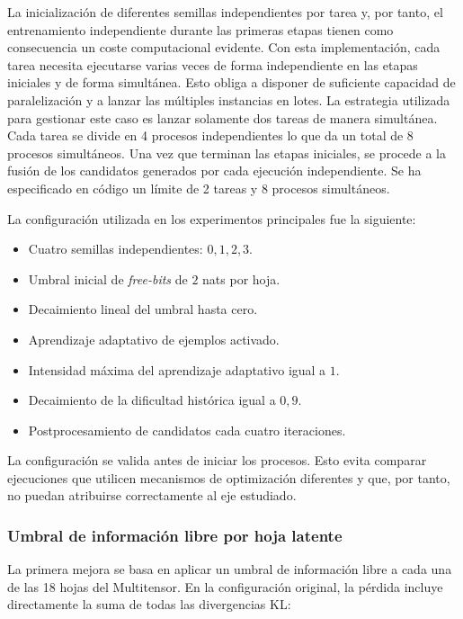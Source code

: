 \documentclass[11pt,a4paper,spanish]{book}
\numberwithin{equation}{chapter}
\numberwithin{figure}{chapter}
\begin{document}
La inicialización de diferentes semillas independientes por tarea y, por tanto, el entrenamiento independiente durante las primeras etapas tienen como
consecuencia un coste computacional evidente. Con esta implementación, cada tarea necesita ejecutarse varias veces de forma independiente
en las etapas iniciales y de forma simultánea. Esto obliga a disponer de suficiente capacidad de paralelización y a lanzar las múltiples instancias
en lotes. La estrategia utilizada para gestionar este caso es lanzar solamente dos tareas de manera simultánea. Cada tarea se divide en 4 procesos
independientes lo que da un total de 8 procesos simultáneos. Una vez que terminan las etapas iniciales, se procede a la fusión de los candidatos generados 
por cada ejecución independiente. Se ha especificado en código un límite de 2 tareas y 8 procesos simultáneos.

La configuración utilizada en los experimentos principales fue la siguiente:

\begin{itemize}
    \item Cuatro semillas independientes: \(0,1,2,3\).
    \item Umbral inicial de \textit{free-bits} de \(2\) nats por hoja.
    \item Decaimiento lineal del umbral hasta cero.
	\item Aprendizaje adaptativo de ejemplos activado.
	\item Intensidad máxima del aprendizaje adaptativo igual a \(1\).
	\item Decaimiento de la dificultad histórica igual a \(0{,}9\).
    \item Postprocesamiento de candidatos cada cuatro iteraciones.
\end{itemize}

La configuración se valida antes de iniciar los procesos. Esto evita comparar ejecuciones que utilicen mecanismos de optimización diferentes y que, por tanto, 
no puedan atribuirse correctamente al eje estudiado.

\subsubsection{Umbral de información libre por hoja latente}

La primera mejora se basa en aplicar un umbral de información libre a cada una de las 18 hojas del Multitensor. En la configuración original, la pérdida
incluye directamente la suma de todas las divergencias KL:
\end{document}
